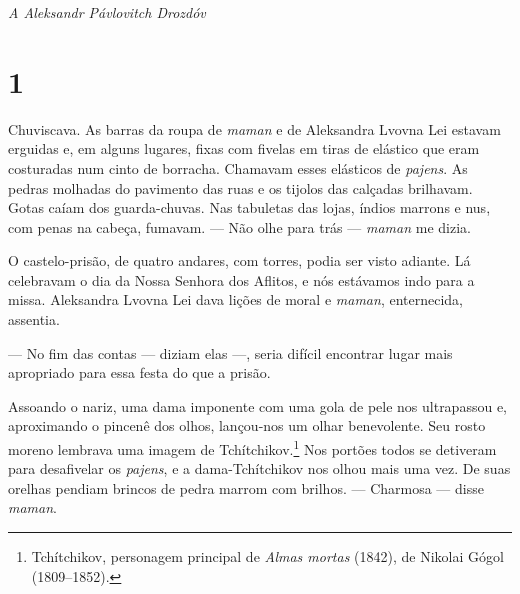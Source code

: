 \blankpage

\pagebreak
\thispagestyle{empty}


\begin{vplace}[.8]
\begin{center}
{}
\end{center}
\end{vplace}

\pagebreak

\begin{vplace}[30]
\begin{flushright}
\emph{A Aleksandr Pávlovitch Drozdóv}
\end{flushright}
\end{vplace}
\thispagestyle{empty}

\pagebreak

\blankpage

\pagebreak
\thispagestyle{empty}
\movetooddpage

\section{1} \label{cidade}

Chuviscava. As barras da roupa de \emph{maman} e de Aleksandra Lvovna
Lei estavam erguidas e, em alguns lugares, fixas com fivelas em tiras de
elástico que eram costuradas num cinto de borracha. Chamavam esses
elásticos de \emph{pajens}. As pedras molhadas do pavimento das ruas e
os tijolos das calçadas brilhavam. Gotas caíam dos guarda-chuvas. Nas
tabuletas das lojas, índios marrons e nus, com penas na cabeça, fumavam.
--- Não olhe para trás --- \emph{maman} me dizia.

O castelo-prisão, de quatro andares, com torres, podia ser visto
adiante. Lá celebravam o dia da Nossa Senhora dos Aflitos, e nós
estávamos indo para a missa. Aleksandra Lvovna Lei dava lições de moral
e \emph{maman}, enternecida, assentia.

--- No fim das contas --- diziam elas ---, seria difícil encontrar lugar
mais apropriado para essa festa do que a prisão.

Assoando o nariz, uma dama imponente com uma gola de pele nos
ultrapassou e, aproximando o pincenê dos olhos, lançou-nos um olhar
benevolente. Seu rosto moreno lembrava uma imagem de
Tchítchikov.\footnote{Tchítchikov, personagem principal de \emph{Almas
  mortas} (1842), de Nikolai Gógol (1809--1852).} Nos portões
todos se detiveram para desafivelar os \emph{pajens}, e a
dama-Tchítchikov nos olhou mais uma vez. De suas orelhas pendiam brincos
de pedra marrom com brilhos. --- Charmosa --- disse \emph{maman}.

